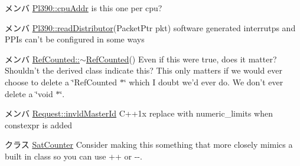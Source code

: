 \label{todo__todo000055}
\hypertarget{todo__todo000055}{}
 
\begin{DoxyDescription}
\item[メンバ \hyperlink{classPl390_a604af0bb85a2a3f90c842febc7e8f87d}{Pl390::cpuAddr} ]is this one per cpu? 
\end{DoxyDescription}

\label{todo__todo000053}
\hypertarget{todo__todo000053}{}
 
\begin{DoxyDescription}
\item[メンバ \hyperlink{classPl390_a4eccad5b19d64abe6178573f999b2b3b}{Pl390::readDistributor}(PacketPtr pkt) ]software generated interrutps and PPIs can't be configured in some ways 
\end{DoxyDescription}

\label{todo__todo000008}
\hypertarget{todo__todo000008}{}
 
\begin{DoxyDescription}
\item[メンバ \hyperlink{classRefCounted_ae6cca02ff208ebb8704f20b56e6de02b}{RefCounted::$\sim$RefCounted}() ]Even if this were true, does it matter? Shouldn't the derived class indicate this? This only matters if we would ever choose to delete a \char`\"{}RefCounted $\ast$\char`\"{} which I doubt we'd ever do. We don't ever delete a \char`\"{}void $\ast$\char`\"{}. 
\end{DoxyDescription}

\label{todo__todo000085}
\hypertarget{todo__todo000085}{}
 
\begin{DoxyDescription}
\item[メンバ \hyperlink{classRequest_a1bb5b2ea96370ac4071dbe85cc9883c8}{Request::invldMasterId} ]C++1x replace with numeric\_\-limits when constexpr is added 
\end{DoxyDescription}

\label{todo__todo000049}
\hypertarget{todo__todo000049}{}
 
\begin{DoxyDescription}
\item[クラス \hyperlink{classSatCounter}{SatCounter} ]Consider making this something that more closely mimics a built in class so you can use ++ or -\/-\/. 
\end{DoxyDescription}

\label{todo__todo000087}
\hypertarget{todo__todo000087}{}
 
